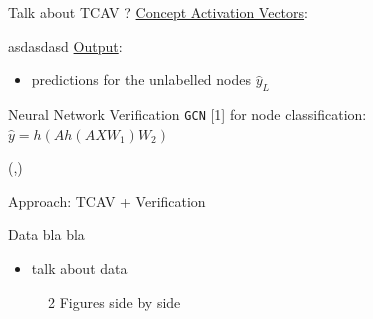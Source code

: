 \documentclass[final]{beamer}
\begin{document}
\begin{frame}[fragile]{}
\begin{textblock}{\colwidth}
\begin{paddedBlock}{Talk about TCAV ?}
\underline{Concept Activation Vectors}:

asdasdasd 
\underline{Output}:
\begin{itemize}
	\item predictions for the unlabelled nodes $\hat{y}_L$
\end{itemize}
\end{paddedBlock}

\begin{paddedBlock}{Neural Network Verification}
\texttt{GCN} [1] for node classification: $\hat{y} = h(Ah(AXW_1)W_2)$

\end{paddedBlock}
\end{textblock}

\begin{textblock}{\colwidth}(\secondcolpos,\vstartCols)
\begin{paddedBlock}{Approach: TCAV + Verification}

\alert{Data bla bla}
  \begin{itemize}
    \item talk about data
  \end{itemize}

\begin{figure}%
    \centering
    \qquad
    \caption{2 Figures side by side}%
    \label{fig:example}%
\end{figure}


\end{paddedBlock}
\end{textblock}
\end{frame}
\end{document}
